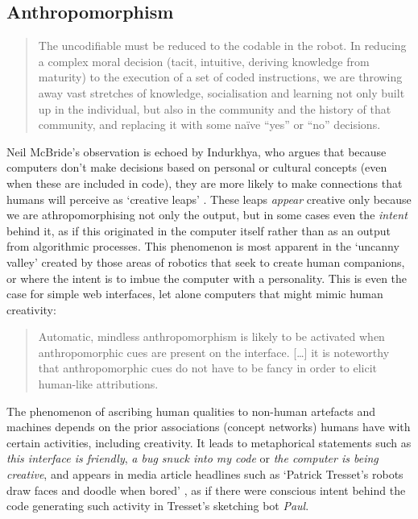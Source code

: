 \subsection{Anthropomorphism}
\label{ss:anthropomorphism}

\begin{quotation}
  The uncodifiable must be reduced to the codable in the robot. In reducing a complex moral decision (tacit, intuitive, deriving knowledge from maturity) to the execution of a set of coded instructions, we are throwing away vast stretches of knowledge, socialisation and learning not only built up in the individual, but also in the community and the history of that community, and replacing it with some na{\"i}ve ``yes'' or ``no'' decisions. 
\end{quotation}

Neil McBride's observation is echoed by Indurkhya, who argues that because computers don't make decisions based on personal or cultural concepts (even when these are included in code), they are more likely to make connections that humans will perceive as `creative leaps' \autocite{Indurkhya}. These leaps \emph{appear} creative only because we are athropomorphising not only the output, but in some cases even the \emph{intent} behind it, as if this originated in the computer itself rather than as an output from algorithmic processes. This phenomenon is most apparent in the `uncanny valley' created by those areas of robotics that seek to create human companions, or where the intent is to imbue the computer with a personality. This is even the case for simple web interfaces, let alone computers that might mimic human creativity:

\begin{quotation}
  Automatic, mindless anthropomorphism is likely to be activated when anthropomorphic cues are present on the interface. [\ldots] it is noteworthy that anthropomorphic cues do not have to be fancy in order to elicit human-like attributions. 
\end{quotation}

The phenomenon of ascribing human qualities to non-human artefacts and machines depends on the prior associations (concept networks) humans have with certain activities, including creativity. It leads to metaphorical statements such as \emph{this interface is friendly}, \emph{a bug snuck into my code} or \emph{the computer is being creative}, and appears in media article headlines such as `Patrick Tresset\rq s robots draw faces and doodle when bored' \autocite{Wired2011}, as if there were conscious intent behind the code generating such activity in Tresset's sketching bot \emph{Paul}.


